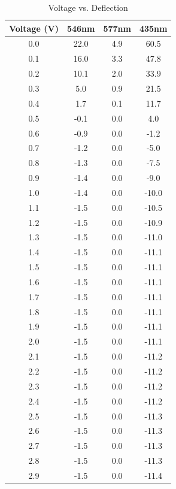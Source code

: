 \documentclass{amsart}
\begin{document}
\begin{table}[H]
    \begin{minipage}{.42\textwidth}
\centering
\caption{Voltage vs. Deflection}
\label{my-label}
\begin{tabular}{@{}c|c|c|c@{}}
Voltage (V) & 546nm & 577nm & 435nm \\ \hline
0.0         & 22.0  & 4.9   & 60.5  \\
0.1         & 16.0  & 3.3   & 47.8  \\
0.2         & 10.1  & 2.0   & 33.9  \\
0.3         & 5.0   & 0.9   & 21.5  \\
0.4         & 1.7   & 0.1   & 11.7  \\
0.5         & -0.1  & 0.0   & 4.0   \\
0.6         & -0.9  & 0.0   & -1.2  \\
0.7         & -1.2  & 0.0   & -5.0  \\
0.8         & -1.3  & 0.0   & -7.5  \\
0.9         & -1.4  & 0.0   & -9.0  \\
1.0         & -1.4  & 0.0   & -10.0 \\
1.1         & -1.5  & 0.0   & -10.5 \\
1.2         & -1.5  & 0.0   & -10.9 \\
1.3         & -1.5  & 0.0   & -11.0 \\
1.4         & -1.5  & 0.0   & -11.1 \\
1.5         & -1.5  & 0.0   & -11.1 \\
1.6         & -1.5  & 0.0   & -11.1 \\
1.7         & -1.5  & 0.0   & -11.1 \\
1.8         & -1.5  & 0.0   & -11.1 \\
1.9         & -1.5  & 0.0   & -11.1 \\
2.0         & -1.5  & 0.0   & -11.1 \\
2.1         & -1.5  & 0.0   & -11.2 \\
2.2         & -1.5  & 0.0   & -11.2 \\
2.3         & -1.5  & 0.0   & -11.2 \\
2.4         & -1.5  & 0.0   & -11.2 \\
2.5         & -1.5  & 0.0   & -11.3 \\
2.6         & -1.5  & 0.0   & -11.3 \\
2.7         & -1.5  & 0.0   & -11.3 \\
2.8         & -1.5  & 0.0   & -11.3 \\
2.9         & -1.5  & 0.0   & -11.4
\end{tabular}
\vspace{0.8cm}


\end{minipage}
\end{table}
\end{document}
